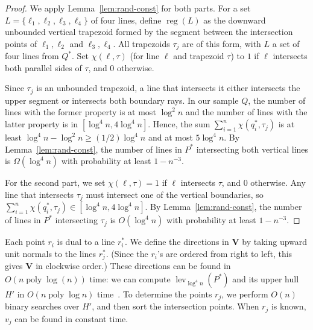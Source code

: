 \documentclass[letterpaper,11pt]{article}
\DeclareMathOperator{\poly}{poly}
\DeclareMathOperator{\reg}{reg}
\DeclareMathOperator{\lev}{lev}
\begin{document}
\begin{proof} 
We apply Lemma~\ref{lem:rand-const} 
for both parts.
For a set $L = \{\ell_1, \ell_2, \ell_3, \ell_4\}$ 
of four lines,
define $\reg(L)$ as the downward 
unbounded vertical trapezoid formed by 
the segment between the intersection
points of $\ell_1, \ell_2$ and 
$\ell_3, \ell_4$. 
All trapezoids $\tau_j$ 
are of this form, with $L$
a set of four lines from $Q^*$.
Set $\chi(\ell, \tau)$ (for line $\ell$ 
and trapezoid $\tau$)
to $1$ if $\ell$ intersects both 
parallel sides of $\tau$, and $0$ otherwise.

Since $\tau_j$ is an unbounded
trapezoid, a line that 
intersects it either 
intersects the upper segment
or intersects both boundary rays. 
In our sample $Q$, the number 
of lines with the former
property is at most $\log^2n$
and the number of lines with 
the latter property is in 
$[\log^4n,4\log^4n]$.
Hence, the sum 
$\sum_{i=1}^n \chi(q^*_i, \tau_j)$ is at least 
$\log^4 n - \log^2 n \geq (1/2)\log^4 n$ 
and at most $5\log^4n$.
By Lemma~\ref{lem:rand-const}, 
the number of lines in $P^*$ intersecting
both vertical lines is 
$\Omega(\log^4n)$ with probability 
at least 
$1 - n^{-3}$.

For the second part, we 
set $\chi(\ell, \tau) = 1$ 
if $\ell$ 
intersects $\tau$, and $0$ otherwise. 
Any line that intersects $\tau_j$
must intersect one of the 
vertical boundaries,
so 
$\sum_{i=1}^n \chi(q^*_i, \tau_j) \in [\log^4n, 4\log^4 n]$.
By Lemma~\ref{lem:rand-const}, 
the number of lines in $P^*$ intersecting
$\tau_j$ is $O(\log^4n)$ 
with probability at least $1 - n^{-3}$.
\end{proof}

Each point $r_i$ is dual 
to a line $r_i^*$. We define the
directions in $\textbf{V}$ by 
taking upward unit normals to 
the lines $r_j^*$.  (Since the $r_i$'s 
are ordered from right to left, this 
gives $\textbf{V}$ in clockwise order.)
These directions can 
be found in $O(n \poly\log(n))$
time: we can compute $\lev_{\log^4 n}(P^*)$ 
and its upper hull $H'$ in $O(n \poly\log n)$ 
time~\cite{ColeShYa87,Dey98}.
To determine the points $r_j$, 
we perform $O(n)$ binary searches over
$H'$, and then sort the intersection points. 
When $r_j$ is
known, $v_j$ can be found 
in constant time.
\end{document}
